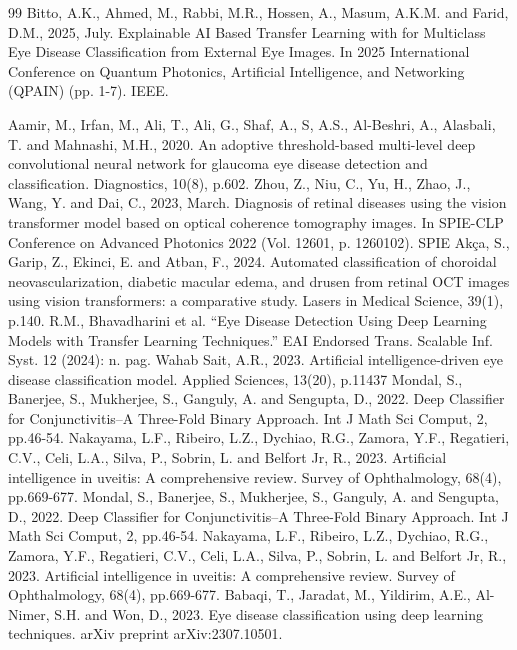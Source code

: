 \documentclass[conference,9pt]{IEEEtran}
\begin{document}

\begin{thebibliography}{99}
Bitto, A.K., Ahmed, M., Rabbi, M.R., Hossen, A., Masum, A.K.M. and Farid, D.M., 2025, July. Explainable AI Based Transfer Learning with for Multiclass Eye Disease Classification from External Eye Images. In 2025 International Conference on Quantum Photonics, Artificial Intelligence, and Networking (QPAIN) (pp. 1-7). IEEE.

Aamir, M., Irfan, M., Ali, T., Ali, G., Shaf, A., S, A.S., Al-Beshri, A., Alasbali, T. and Mahnashi, M.H., 2020. An adoptive threshold-based multi-level deep convolutional neural network for glaucoma eye disease detection and classification. Diagnostics, 10(8), p.602.
Zhou, Z., Niu, C., Yu, H., Zhao, J., Wang, Y. and Dai, C., 2023, March. Diagnosis of retinal diseases using the vision transformer model based on optical coherence tomography images. In SPIE-CLP Conference on Advanced Photonics 2022 (Vol. 12601, p. 1260102). SPIE
 Akça, S., Garip, Z., Ekinci, E. and Atban, F., 2024. Automated classification of choroidal neovascularization, diabetic macular edema, and drusen from retinal OCT images using vision transformers: a comparative study. Lasers in Medical Science, 39(1), p.140.
R.M., Bhavadharini et al. “Eye Disease Detection Using Deep Learning Models with Transfer Learning Techniques.” EAI Endorsed Trans. Scalable Inf. Syst. 12 (2024): n. pag.
Wahab Sait, A.R., 2023. Artificial intelligence-driven eye disease classification model. Applied Sciences, 13(20), p.11437
Mondal, S., Banerjee, S., Mukherjee, S., Ganguly, A. and Sengupta, D., 2022. Deep Classifier for Conjunctivitis–A Three-Fold Binary Approach. Int J Math Sci Comput, 2, pp.46-54.
Nakayama, L.F., Ribeiro, L.Z., Dychiao, R.G., Zamora, Y.F., Regatieri, C.V., Celi, L.A., Silva, P., Sobrin, L. and Belfort Jr, R., 2023. Artificial intelligence in uveitis: A comprehensive review. Survey of Ophthalmology, 68(4), pp.669-677.
Mondal, S., Banerjee, S., Mukherjee, S., Ganguly, A. and Sengupta, D., 2022. Deep Classifier for Conjunctivitis–A Three-Fold Binary Approach. Int J Math Sci Comput, 2, pp.46-54.
Nakayama, L.F., Ribeiro, L.Z., Dychiao, R.G., Zamora, Y.F., Regatieri, C.V., Celi, L.A., Silva, P., Sobrin, L. and Belfort Jr, R., 2023. Artificial intelligence in uveitis: A comprehensive review. Survey of Ophthalmology, 68(4), pp.669-677.
Babaqi, T., Jaradat, M., Yildirim, A.E., Al-Nimer, S.H. and Won, D., 2023. Eye disease classification using deep learning techniques. arXiv preprint arXiv:2307.10501.   

\end{thebibliography}
\end{document}
